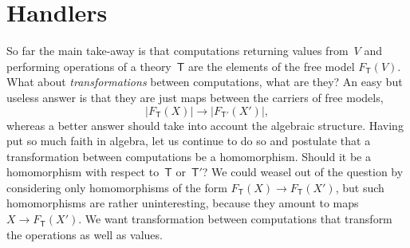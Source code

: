 \documentclass{amsart}
\newcommand{\theory}[1]{\mathsf{#1}} %
\newcommand{\carrier}[1]{|#1|} %
\newcommand{\Free}[2]{F_{\theory{#1}}(#2)} %
\begin{document}
\section{Handlers}
\label{sec:handlers}

So far the main take-away is that computations returning values from~$V$ and
performing operations of a theory~$\theory{T}$ are the elements of the free
model $\Free{T}{V}$. What about \emph{transformations} between computations,
what are they? An easy but useless answer is that they are just maps between the
carriers of free models,
%
\begin{equation*}
  \carrier{\Free{T}{X}} \longrightarrow \carrier{\Free{T'}{X'}},
\end{equation*}
%
whereas a better answer should take into account the algebraic structure. Having
put so much faith in algebra, let us continue to do so and postulate that a
transformation between computations be a homomorphism. Should it be a
homomorphism with respect to~$\theory{T}$ or~$\theory{T}'$? We could weasel out
of the question by considering only homomorphisms of the form
$\Free{T}{X} \to \Free{T}{X'}$, but such homomorphisms are rather uninteresting,
because they amount to maps~$X \to \Free{T}{X'}$. We want
transformation between computations that transform the operations as well as
values.
\end{document}
